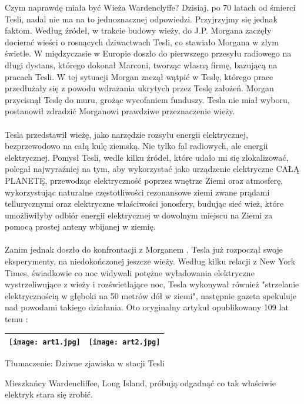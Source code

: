 \documentclass{article}
\begin{document}
\begin{large}
\indent Czym naprawdę miała być Wieża Wardenclyffe? Dzisiaj, po 70 latach od śmierci Tesli, nadal nie ma na to jednoznacznej odpowiedzi. Przyjrzyjmy się jednak faktom. Według źródeł, w trakcie budowy wieży, do J.P. Morgana zaczęły docierać wieści o rosnących dziwactwach Tesli, co stawiało Morgana w złym świetle. W międzyczasie w Europie doszło do pierwszego przesyłu radiowego na długi dystans, którego dokonał Marconi, tworząc własną firmę, bazującą na pracach Tesli. W tej sytuacji Morgan zaczął wątpić w Teslę, którego prace przedłużały się z powodu wdrażania ukrytych przez Teslę założeń. Morgan przycisnął Teslę do muru, grożąc wycofaniem funduszy. Tesla nie miał wyboru, postanowił zdradzić Morganowi prawdziwe przeznaczenie wieży.
\\
\\
\indent Tesla przedstawił wieżę, jako narzędzie rozsyłu energii elektrycznej, bezprzewodowo na całą kulę ziemską. Nie tylko fal radiowych, ale energii elektrycznej. Pomysł Tesli, wedle kilku źródeł, które udało mi się zlokalizować, polegał najwyraźniej na tym, aby wykorzystać jako urządzenie elektryczne CAŁĄ PLANETĘ, przewodząc elektryczność poprzez wnętrze Ziemi oraz atmosferę, wykorzystując naturalne częstotliwości rezonansowe ziemi zwane prądami tellurycznymi oraz elektryczne właściwości jonosfery, budując sieć wież, które umożliwiłyby odbiór energii elektrycznej w dowolnym miejscu na Ziemi za pomocą prostej anteny wbijanej w ziemię.
\\
\\
\indent Zanim jednak doszło do konfrontacji z Morganem , Tesla już rozpoczął swoje eksperymenty, na niedokończonej jeszcze wieży. Według kilku relacji z New York Times, świadkowie co noc widywali potężne wyładowania elektryczne wystrzeliwujące z wieży i rozświetlające noc, Tesla wykonywał również "strzelanie elektrycznością w głęboki na 50 metrów dół w ziemi", następnie gazeta spekuluje nad powodami takiego działania. Oto oryginalny artykuł opublikowany 109 lat temu :
\\

\begin{table}[t]
\begin{tabular}{|c|c|}
\hline
\texttt{[image: art1.jpg]} & \texttt{[image: art2.jpg]} \\
\hline
\end{tabular} 
\end{table}

\indent Tłumaczenie: Dziwne zjawiska w stacji Tesli


Mieszkańcy Wardencliffee, Long Island, próbują odgadnąć co tak właściwie elektryk stara się zrobić.


\end{large}
\end{document}
